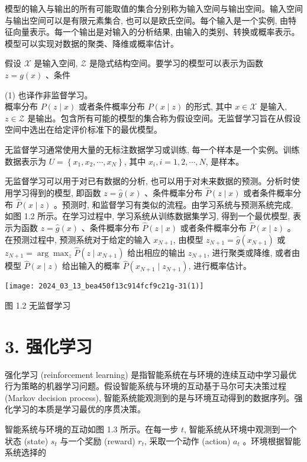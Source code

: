 \documentclass[10pt]{article}
\begin{document}
\begin{CJK*}{UTF8}{bsmi}
模型的输入与输出的所有可能取值的集合分别称为输入空间与输出空间。输入空间与输出空间可以是有限元素集合, 也可以是欧氏空间。每个输入是一个实例, 由特征向量表示。每一个输出是对输入的分析结果, 由输入的类别、转换或概率表示。模型可以实现对数据的聚类、降维或概率估计。

假设 $\mathcal{X}$ 是输入空间, $\mathcal{Z}$ 是隐式结构空间。要学习的模型可以表示为函数 $z=g(x)$ 、条件

(1) 也译作非监督学习。\\
概率分布 $P(z \mid x)$ 或者条件概率分布 $P(x \mid z)$ 的形式, 其中 $x \in \mathcal{X}$ 是输入, $z \in \mathcal{Z}$ 是输出。包含所有可能的模型的集合称为假设空间。无监督学习旨在从假设空间中选出在给定评价标准下的最优模型。

无监督学习通常使用大量的无标注数据学习或训练, 每一个样本是一个实例。训练数据表示为 $U=\left\{x_{1}, x_{2}, \cdots, x_{N}\right\}$, 其中 $x_{i}, i=1,2, \cdots, N$, 是样本。

无监督学习可以用于对已有数据的分析, 也可以用于对未来数据的预测。分析时使用学习得到的模型, 即函数 $z=\hat{g}(x)$ 、条件概率分布 $\hat{P}(z \mid x)$ 或者条件概率分布 $\hat{P}(x \mid z)$ 。预测时, 和监督学习有类似的流程。由学习系统与预测系统完成, 如图 1.2 所示。在学习过程中, 学习系统从训练数据集学习, 得到一个最优模型, 表示为函数 $z=\hat{g}(x)$ 、条件概率分布 $\hat{P}(z \mid x)$ 或者条件概率分布 $\hat{P}(x \mid z)$ 。在预测过程中, 预测系统对于给定的输入 $x_{N+1}$, 由模型 $z_{N+1}=\hat{g}\left(x_{N+1}\right)$ 或 $z_{N+1}=\arg \max _{z} \hat{P}\left(z \mid x_{N+1}\right)$ 给出相应的输出 $z_{N+1}$, 进行聚类或降维, 或者由模型 $\hat{P}(x \mid z)$ 给出输入的概率 $\hat{P}\left(x_{N+1} \mid z_{N+1}\right)$, 进行概率估计。

\begin{center}
\texttt{[image: 2024\_03\_13\_bea450f13c914fcf9c21g-31(1)]}
\end{center}

图 1.2 无监督学习

\section*{3. 强化学习}
强化学习 (reinforcement learning) 是指智能系统在与环境的连续互动中学习最优行为策略的机器学习问题。假设智能系统与环境的互动基于马尔可夫决策过程 (Markov decision process), 智能系统能观测到的是与环境互动得到的数据序列。强化学习的本质是学习最优的序贯决策。

智能系统与环境的互动如图 1.3 所示。在每一步 $t$, 智能系统从环境中观测到一个状态 (state) $s_{t}$ 与一个奖励 (reward) $r_{t}$, 采取一个动作 (action) $a_{t}$ 。环境根据智能系统选择的


\end{CJK*}
\end{document}
